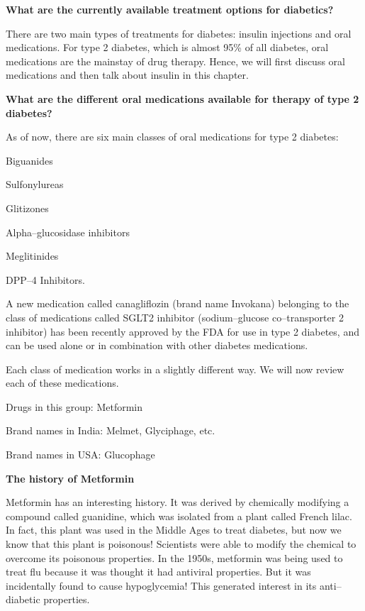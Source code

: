 \textbf{What are the currently available treatment options for diabetics?}

There are two main types of treatments for diabetes: insulin injections and oral medications. For type 2 diabetes, which is almost 95\% of all diabetes, oral medications are the mainstay of drug therapy. Hence, we will first discuss oral medications and then talk about insulin in this chapter.

\textbf{What are the different oral medications available for therapy of type 2 diabetes?}

As of now, there are six main classes of oral medications for type 2 diabetes:

\item Biguanides

 \item Sulfonylureas

 \item Glitizones

 \item Alpha–glucosidase inhibitors

 \item Meglitinides

 \item DPP–4 Inhibitors.

A new medication called canagliflozin (brand name Invokana) belonging to the class of medications called SGLT2 inhibitor (sodium–glucose co–transporter 2 inhibitor) has been recently approved by the FDA for use in type 2 diabetes, and can be used alone or in combination with other diabetes medications.

Each class of medication works in a slightly different way. We will now review each of these medications.


Drugs in this group: Metformin

Brand names in India: Melmet, Glyciphage, etc.

Brand names in USA: Glucophage

\textbf{The history of Metformin}

Metformin has an interesting history. It was derived by chemically modifying a compound called guanidine, which was isolated from a plant called French lilac. In fact, this plant was used in the Middle Ages to treat diabetes, but now we know that this plant is poisonous! Scientists were able to modify the chemical to overcome its poisonous properties. In the 1950s, metformin was being used to treat flu because it was thought it had antiviral properties. But it was incidentally found to cause hypoglycemia! This generated interest in its anti–diabetic properties.

